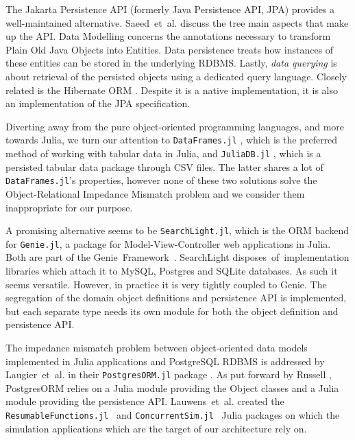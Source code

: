 \documentclass{juliacon}
\begin{document}
The Jakarta Persistence API (formerly Java Persistence API, JPA) provides a well-maintained alternative. Saeed~et~al. \cite{saeed2022persistence} discuss the tree main aspects that make up the API. Data Modelling concerns the annotations necessary to transform Plain Old Java Objects into Entities. Data persistence treats how instances of these entities can be stored in the underlying RDBMS. Lastly, \emph{data querying} is about retrieval of the persisted objects using a dedicated query language. Closely related is the Hibernate ORM \cite{hibernate}. Despite it is a native implementation, it is also an implementation of the JPA specification.\vskip 6pt

Diverting away from the pure object-oriented programming languages, and more towards Julia, we turn our attention to \texttt{DataFrames.jl} \cite{Dataframes}, which is the preferred method of working with tabular data in Julia, and \texttt{JuliaDB.jl} \cite{JuliaDB}, which is a persisted tabular data package through CSV files. The latter shares a lot of \texttt{DataFrames.jl}'s properties, however none of these two solutions solve the Object-Relational Impedance Mismatch problem and we consider them inappropriate for our purpose.\vskip 6pt

A promising alternative seems to be \texttt{SearchLight.jl}, which is the ORM backend for \texttt{Genie.jl}, a package for Model-View-Controller web applications in Julia. Both are part of the \mbox{Genie~Framework~\cite{genie}}. SearchLight disposes~of~implementation libraries which attach it to MySQL, Postgres and SQLite databases. As such it seems versatile. However, in practice it is very tightly coupled to Genie. The segregation of the domain object definitions and persistence API is implemented, but each separate type needs its own module for both the object definition and persistence API.\vskip 6pt

The impedance mismatch problem between object-oriented data models implemented in Julia applications and PostgreSQL RDBMS is addressed by Laugier~et~al. in their \texttt{PostgresORM.jl} package \cite{tecnivelPostgresORM}. As put forward by Russell \cite{russell2008bridging}, PostgresORM relies on a Julia module providing the Object classes and a Julia module providing the persistence API. Lauwens~et~al. created the \mbox{\texttt{ResumableFunctions.jl} \cite{lauwens2017resumablefunctions}} and \mbox{\texttt{ConcurrentSim.jl} \cite{lauwens2017simjulia,lauwens2017simjuliaSite}} Julia packages on which the simulation applications which are the target of our architecture rely on.\vskip 6pt
\end{document}
